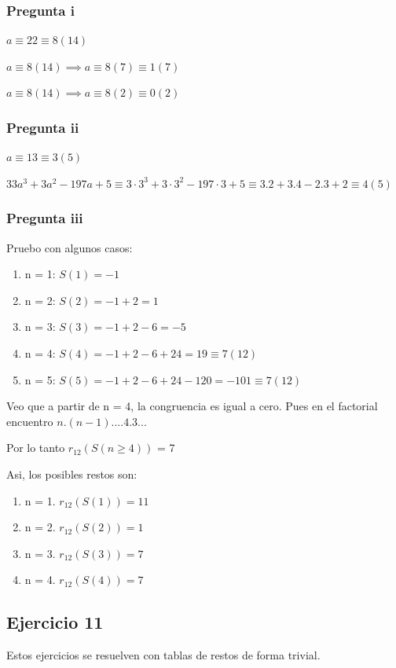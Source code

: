 \subsubsection{Pregunta i}
$ a\equiv 22 \equiv 8(14)$

$ a\equiv 8(14) \implies a \equiv 8(7) \equiv 1(7)$

$ a\equiv 8(14) \implies a \equiv 8(2) \equiv 0(2)$

\subsubsection{Pregunta ii}
$ a \equiv 13 \equiv 3(5) $

$ 33a^3 + 3a^2 - 197a +5 \equiv 3 \cdot 3^3 + 3 \cdot 3^2 - 197 \cdot 3 + 5 \equiv 3.2 + 3.4 -2.3 + 2 \equiv 4(5) $

\subsubsection{Pregunta iii}
Pruebo con algunos casos:
\begin{enumerate}
    \item n = 1: $ S(1) = -1 $ 
    \item n = 2: $ S(2) = -1 + 2 = 1 $ 
    \item n = 3: $ S(3) = -1 + 2 -6 = -5 $ 
    \item n = 4: $ S(4) = -1 + 2 -6 + 24 = 19 \equiv 7(12) $ 
    \item n = 5: $ S(5) = -1 + 2 -6 + 24 -120 = -101 \equiv 7(12) $ 
\end{enumerate}

Veo que a partir de n = 4, la congruencia es igual a cero. Pues en el factorial encuentro $ n.(n-1)....4.3... $

Por lo tanto $r_{12}(S(n\geq 4))$ = 7

Asi, los posibles restos son:
\begin{enumerate}
    \item n = 1. $ r_{12}(S(1)) = 11 $
    \item n = 2. $ r_{12}(S(2)) = 1 $
    \item n = 3. $ r_{12}(S(3)) = 7 $
    \item n = 4. $ r_{12}(S(4)) = 7 $
\end{enumerate}

\subsection{Ejercicio 11}
Estos ejercicios se resuelven con tablas de restos de forma trivial.

